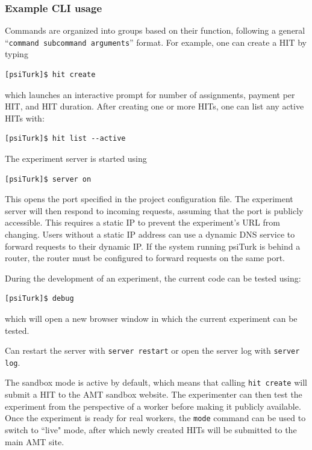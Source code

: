 \documentclass[twocolumn]{svjour3}          %
\begin{document}
\subsubsection{Example CLI usage}
Commands are organized into groups based on their function, following a general ``\texttt{command subcommand
arguments}'' format. For example, one can create a HIT by typing 

\begin{lstlisting}
[psiTurk]$ hit create
\end{lstlisting}

\noindent which launches an interactive prompt for number of assignments, payment per HIT, and HIT duration. After creating one or more HITs, one can list any active HITs with:

\begin{lstlisting}
[psiTurk]$ hit list --active
\end{lstlisting}

The experiment server is started using

\begin{lstlisting}
[psiTurk]$ server on
\end{lstlisting}

\noindent This opens the port specified in the project configuration file.
The experiment server will then respond to incoming requests, assuming that the port is publicly accessible.
This requires a static IP to prevent the experiment's URL from changing.
Users without a static IP address can use a dynamic DNS service to forward requests to their dynamic IP.
If the system running psiTurk is behind a router, the router must be configured to forward requests on the same port.

During the development of an experiment, the current code can be tested using:

\begin{lstlisting}
[psiTurk]$ debug
\end{lstlisting}

\noindent which will open a new browser window in which the current experiment can be tested.

Can restart the server with \texttt{server restart} or open the server log with \texttt{server log}. 

The sandbox mode is active by default, which means that calling \texttt{hit create} will submit a HIT to the AMT sandbox website.
The experimenter can then test the experiment from the perspective of a worker before making it publicly available.
Once the experiment is ready for real workers, the \texttt{mode} command can be used to switch to ``live" mode, after which newly created HITs will be submitted to the main AMT site.
\end{document}
